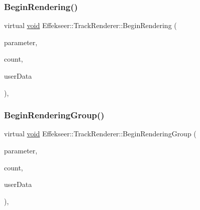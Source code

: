 \subsubsection{\texorpdfstring{Begin\+Rendering()}{BeginRendering()}}
{\footnotesize\ttfamily virtual \mbox{\hyperlink{namespace_effekseer_ab34c4088e512200cf4c2716f168deb56}{void}} Effekseer\+::\+Track\+Renderer\+::\+Begin\+Rendering (\begin{DoxyParamCaption}\item[{const \mbox{\hyperlink{struct_effekseer_1_1_track_renderer_1_1_node_parameter}{Node\+Parameter}} \&}]{parameter,  }\item[{int32\+\_\+t}]{count,  }\item[{\mbox{\hyperlink{namespace_effekseer_ab34c4088e512200cf4c2716f168deb56}{void}} $\ast$}]{user\+Data }\end{DoxyParamCaption})\hspace{0.3cm}{\ttfamily [inline]}, {\ttfamily [virtual]}}

\mbox{\label{class_effekseer_1_1_track_renderer_aabda9da7e26531ca02142af951865bcc}} 
\subsubsection{\texorpdfstring{Begin\+Rendering\+Group()}{BeginRenderingGroup()}}
{\footnotesize\ttfamily virtual \mbox{\hyperlink{namespace_effekseer_ab34c4088e512200cf4c2716f168deb56}{void}} Effekseer\+::\+Track\+Renderer\+::\+Begin\+Rendering\+Group (\begin{DoxyParamCaption}\item[{const \mbox{\hyperlink{struct_effekseer_1_1_track_renderer_1_1_node_parameter}{Node\+Parameter}} \&}]{parameter,  }\item[{int32\+\_\+t}]{count,  }\item[{\mbox{\hyperlink{namespace_effekseer_ab34c4088e512200cf4c2716f168deb56}{void}} $\ast$}]{user\+Data }\end{DoxyParamCaption})\hspace{0.3cm}{\ttfamily [inline]}, {\ttfamily [virtual]}}

\mbox{\label{class_effekseer_1_1_track_renderer_ad8ad4cbe8cdbbaacc2106c3e689ce579}} 
